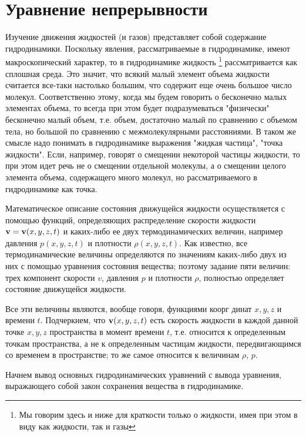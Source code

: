 \section{Уравнение непрерывности}
\label{sec:p1}

Изучение движения жидкостей (и газов) представляет собой содержание
гидродинамики. Поскольку явления, рассматриваемые в гидродинамике, имеют
макроскопический характер, то в гидродинамике жидкость
\footnote{Мы говорим здесь и ниже для краткости только о жидкости, имея при этом
в виду как жидкости, так и газы} рассматривается как
сплошная среда. Это значит, что всякий малый элемент объема жидкости считается
все-таки настолько большим, что содержит еще очень большое число молекул.
Соответственно этому, когда мы будем говорить о бесконечно малых элементах
объема, то всегда при этом будет подразумеваться "физически" бесконечно малый
объем, т.е. объем, достаточно малый по сравнению с объемом тела, но большой по
сравнению с межмолекулярными расстояниями. В таком же смысле надо понимать в
гидродинамике выражения "жидкая частица", "точка жидкости". Если, например,
говорят о смещении некоторой частицы жидкости, то при этом идет речь не о
смещении отдельной молекулы, а о смещении целого элемента объема, содержащего
много молекул, но рассматриваемого в гидродинамике как точка.


Математическое описание состояния движущейся жидкости осуществляется с помощью
функций, определяющих распределение скорости жидкости $\mathbf{v} = \mathbf{v}
(x,y,z,t)$ и каких-либо ее двух термодинамических величин, например давления
$p(x,y,z,t)$ и плотности $\rho(x,y,z,t)$. Как известно, все термодинамические
величины определяются по значениям каких-либо двух из них с помощью уравнения
состояния вещества; поэтому задание пяти величин: трех компонент скорости $v$,
давления $p$ и плотности $\rho$, полностью определяет состояние движущейся
жидкости.

Все эти величины являются, вообще говоря, функциями коорг динат $x,y,z$ и
времени $t$. Подчеркнем, что $\mathbf{v} (x,y,z,t)$ есть скорость жидкости в каждой
данной точке $x,y,z$ пространства в момент времени $t$, т.е. относится к
определенным точкам пространства, а не к определенным частицам жидкости,
передвигающимся со временем в пространстве; то же самое относится к величинам
$\rho$, $p$.

Начнем вывод основных гидродинамических уравнений с вывода уравнения,
выражающего собой закон сохранения вещества в гидродинамике.

